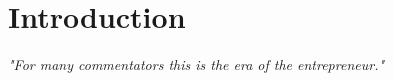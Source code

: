 \chapter{Introduction\label{ch:intro}}

\begin{flushright}
    \textit{"For many commentators this is the era of the entrepreneur." } \\
    [Robert Goffee and Richard Scase, (1987)]
\end{flushright}


